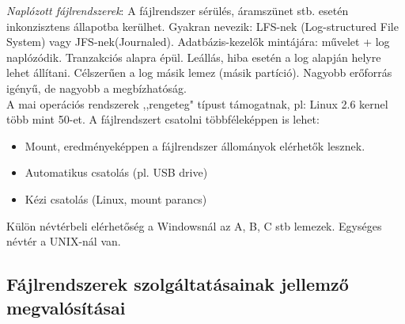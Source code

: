 \documentclass[margin=0px]{article}
\begin{document}
\textit{Naplózott fájlrendszerek}: A fájlrendszer sérülés, áramszünet stb. esetén inkonzisztens állapotba kerülhet. Gyakran nevezik: LFS-nek (Log-structured File System) vagy JFS-nek(Journaled). Adatbázis-kezelők mintájára: művelet + log naplózódik. Tranzakciós alapra épül. Leállás, hiba esetén a log alapján helyre lehet állítani. Célszerűen a log másik lemez (másik partíció). Nagyobb erőforrás igényű, de nagyobb a megbízhatóság. \\
A mai operációs rendszerek ,,rengeteg" típust támogatnak, pl: Linux 2.6 kernel több mint 50-et.
A fájlrendszert csatolni többféleképpen is lehet:
\begin{itemize}
    \item Mount, eredményeképpen a fájlrendszer állományok elérhetők lesznek.
    \item Automatikus csatolás (pl. USB drive)
    \item Kézi csatolás (Linux, mount parancs)
\end{itemize}
Külön névtérbeli elérhetőség a Windowsnál az A, B, C stb lemezek. Egységes névtér a UNIX-nál van.

\subsection{Fájlrendszerek szolgáltatásainak jellemző megvalósításai}
\end{document}
